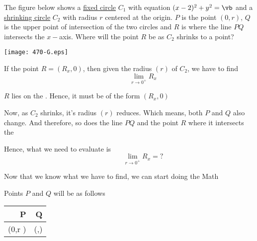 \documentclass[14pt,fleqn]{extarticle}
\newcommand\va{2}
\newcommand\limit{\lim_{r\to 0^+}}
\newcommand\xq{\frac{r^2}{4}}
\newcommand\yq{\frac{r}{4}\sqrt{16-r^2}}
\begin{document}
 

\begin{problem}
	\statement 

The figure below shows a \underline{fixed circle} $C_1$ with equation $(x-\va)^2 + y^2 = \vb$ and a \underline{shrinking circle} $C_2$ with radius $r$ centered at the origin. $P$ is the point $(0,r)$, $Q$ is the upper point of intersection of the two circles and $R$ is where the line $PQ$ intersects the $x-$axis. Where will the point $R$ be as $C_2$ shrinks to a point? 

\begin{center}
\texttt{[image: 470-G.eps]}
\end{center}

\begin{step}
  \begin{options} 
     \correct 
      
     If the point $R = \left(R_x,0 \right)$, then given the radius $(r)$ of $C_2$, we have to find 
     \[ \qquad\qquad \limit R_x \]
        
    \end{options} 
     \reason 
     
     $R$ lies on the \xaxis. Hence, it must be of the form $\left(R_x,0 \right)$ \newline
     
     Now, as $C_2$ shrinks, it's radius $(r)$ reduces. Which means, both $P$ and $Q$ also change. And therefore, so does the line $PQ$ and the point $R$ where it intersects the \xaxis \newline 
     
     Hence, what we need to evaluate is 
     \[ \qquad\qquad \limit R_x = ? \]
     
     Now that we know what we have to find, we can start doing the Math  
\end{step}
          
\begin{step}
  \begin{options} 
     \correct 
      
      Points $P$ and $Q$ will be as follows 
      
      \begin{center}
  \begin{tabular}{NN}
   \toprule
        P & Q \\
   \midrule 
   \left(0,r \right) & \left(\xq,\yq \right) \\
    \bottomrule
  \end{tabular}
\end{center}
       

\end{options}
\end{step}
\end{problem}
\end{document}
